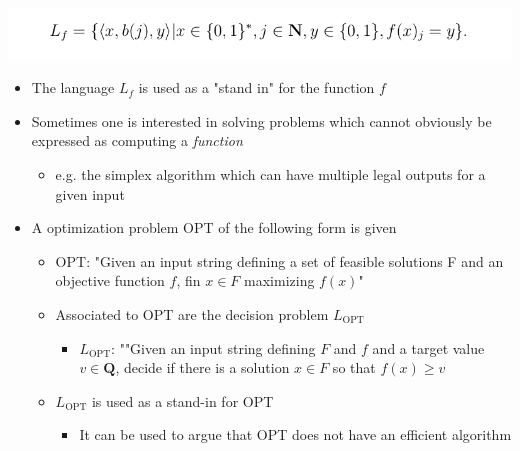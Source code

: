 \documentclass[11pt]{article}
\begin{document}
\begin{center}
\includegraphics[width=.9\linewidth]{P, NP and NPC/screenshot_2019-03-17_18-35-55.png}
\end{center}
\begin{itemize}
\item The language \(L_f\) is used as a "stand in" for the function \(f\)

\item Sometimes one is interested in solving problems which cannot obviously be expressed as computing a \emph{function}
\begin{itemize}
\item e.g. the simplex algorithm which can have multiple legal outputs for a given input
\end{itemize}

\item A optimization problem OPT of the following form is given
\begin{itemize}
\item OPT: "Given an input string defining a set of feasible solutions F and an objective function \(f\), fin \(x \in F\) maximizing \(f(x)\)"
\item Associated to OPT are the decision problem \(L_\text{OPT}\)
\begin{itemize}
\item \(L_\text{OPT}\): ""Given an input string defining \(F\) and \(f\) and a target value \(v \in \mathbf Q\), decide if there is a solution \(x \in F\) so that \(f(x) \geq v\)
\end{itemize}
\item \(L_\text{OPT}\) is used as a stand-in for OPT
\begin{itemize}
\item It can be used to argue that OPT does not have an efficient algorithm
\end{itemize}
\end{itemize}
\end{itemize}
\end{document}
